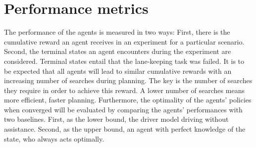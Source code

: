 \section{Performance metrics}
\label{sec:perf_metrics}

The performance of the agents is measured in two ways: First, there is the cumulative reward an agent receives in an experiment for a particular scenario. Second, the terminal states an agent encounters during the experiment are considered. Terminal states entail that the lane-keeping task was failed. It is to be expected that all agents will lead to similar cumulative rewards with an increasing number of searches during planning. The key is the number of searches they require in order to achieve this reward. A lower number of searches means more efficient, faster planning. Furthermore, the optimality of the agents' policies when converged will be evaluated by comparing the agents' performances with two baselines. First, as the lower bound, the driver model driving without assistance. Second, as the upper bound, an agent with perfect knowledge of the state, who always acts optimally.
